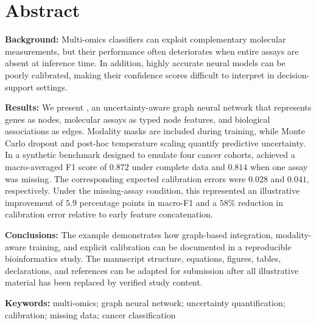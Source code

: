 \section*{Abstract}

\textbf{Background:}
Multi-omics classifiers can exploit complementary molecular measurements, but
their performance often deteriorates when entire assays are absent at inference
time. In addition, highly accurate neural models can be poorly calibrated, making
their confidence scores difficult to interpret in decision-support settings.

\textbf{Results:}
We present \modelname, an uncertainty-aware graph neural network that represents
genes as nodes, molecular assays as typed node features, and biological
associations as edges. Modality masks are included during training, while Monte
Carlo dropout and post-hoc temperature scaling quantify predictive uncertainty.
In a synthetic benchmark designed to emulate four cancer cohorts, \modelname
achieved a macro-averaged F1 score of $0.872$ under complete data and $0.814$ when
one assay was missing. The corresponding expected calibration errors were $0.028$
and $0.041$, respectively. Under the missing-assay condition, this represented an
illustrative improvement of $5.9$ percentage points in macro-F1 and a $58\%$
reduction in calibration error relative to early feature concatenation.

\textbf{Conclusions:}
The example demonstrates how graph-based integration, modality-aware training,
and explicit calibration can be documented in a reproducible bioinformatics
study. The manuscript structure, equations, figures, tables, declarations, and
references can be adapted for submission after all illustrative material has been
replaced by verified study content.

\textbf{Keywords:} multi-omics; graph neural network; uncertainty quantification;
calibration; missing data; cancer classification

\clearpage
{}
\pagestyle{fancy}

